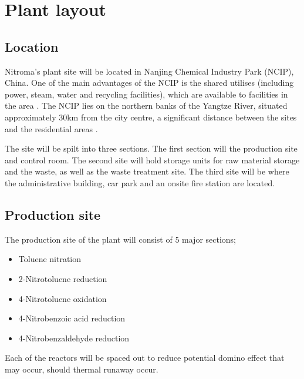 \section{Plant layout}

\subsection{Location}

Nitroma’s plant site will be located in Nanjing Chemical Industry Park (NCIP), China. One of the main advantages of the NCIP is the shared utilises (including power, steam, water and recycling facilities), which are available to facilities in the area \cite{independent_commodity_intelligence_services_china_2007}. The NCIP lies on the northern banks of the Yangtze River, situated approximately 30km from the city centre, a significant distance between the sites and the residential areas \cite{zeng_divergent_2011}.   


The site will be spilt into three sections. The first section will the production site and control room. The second site will hold storage units for raw material storage and the waste, as well as the waste treatment site. The third site will be where the administrative building, car park and an onsite fire station are located. 

\subsection{Production site}

The production site of the plant will consist of 5 major sections; 

\begin{itemize}
    \item Toluene nitration
    \item 2-Nitrotoluene reduction 
    \item 4-Nitrotoluene oxidation 
    \item 4-Nitrobenzoic acid reduction 
    \item 4-Nitrobenzaldehyde reduction 
\end{itemize}

Each of the reactors will be spaced out to reduce potential domino effect that may occur, should thermal runaway occur. 

